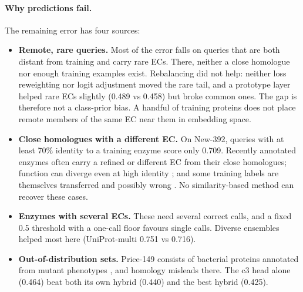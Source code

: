 \documentclass[11pt]{article}
\begin{document}
\paragraph{Why predictions fail.}
The remaining error has four sources:
\begin{itemize}
  \item \textbf{Remote, rare queries.} Most of the error falls on queries that are both distant from training and
        carry rare ECs. There, neither a close homologue nor enough training examples exist. Rebalancing did not help:
        neither loss reweighting nor logit adjustment moved the rare tail, and a prototype layer helped rare ECs
        slightly (0.489 vs 0.458) but broke common ones. The gap is therefore not a class-prior bias. A handful of
        training proteins does not place remote members of the same EC near them in embedding space.
  \item \textbf{Close homologues with a different EC.} On New-392, queries with at least 70\% identity to a training
        enzyme score only 0.709. Recently annotated enzymes often carry a refined or different EC from their close
        homologues; function can diverge even at high identity \cite{rost2002,tian2003}; and some training labels are
        themselves transferred and possibly wrong \cite{schnoes2009}. No similarity-based method can recover these
        cases.
  \item \textbf{Enzymes with several ECs.} These need several correct calls, and a fixed 0.5 threshold with a one-call
        floor favours single calls. Diverse ensembles helped most here (UniProt-multi 0.751 vs 0.716).
  \item \textbf{Out-of-distribution sets.} Price-149 consists of bacterial proteins annotated from mutant phenotypes
        \cite{price2018}, and homology misleads there. The c3 head alone (0.464) beat both its own hybrid (0.440) and
        the best hybrid (0.425).
\end{itemize}
\end{document}
